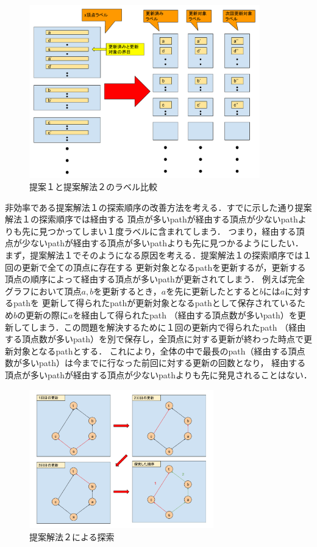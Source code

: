 \documentclass[12pt]{optlab-bachelor}
\begin{document}
\begin{figure}[htbp]
  \centering
  \caption{提案１と提案解法２のラベル比較}
  \includegraphics[width=10.0cm]{fig/fig8.pdf}
\end{figure}

非効率である提案解法１の探索順序の改善方法を考える．すでに示した通り提案解法１の探索順序では経由する
頂点が多いpathが経由する頂点が少ないpathよりも先に見つかってしまい１度ラベルに含まれてしまう．
つまり，経由する頂点が少ないpathが経由する頂点が多いpathよりも先に見つかるようにしたい．
まず，提案解法１でそのようになる原因を考える．提案解法１の探索順序では１回の更新で全ての頂点に存在する
更新対象となるpathを更新するが，更新する頂点の順序によって経由する頂点が多いpathが更新されてしまう．
例えば完全グラフにおいて頂点$a,b$を更新するとき，$a$を先に更新したとすると$b$には$a$に対するpathを
更新して得られたpathが更新対象となるpathとして保存されているため$b$の更新の際に$a$を経由して得られたpath
（経由する頂点数が多いpath）を更新してしまう．この問題を解決するために１回の更新内で得られたpath
（経由する頂点数が多いpath）を別で保存し，全頂点に対する更新が終わった時点で更新対象となるpathとする．
これにより，全体の中で最長のpath（経由する頂点数が多いpath）は今までに行なった前回に対する更新の回数となり，
経由する頂点が多いpathが経由する頂点が少ないpathよりも先に発見されることはない．

\begin{figure}[htbp]
  \centering
  \caption{提案解法２による探索}
  \includegraphics[height=6.0cm, width=8.0cm]{fig/fig7.pdf}
\end{figure}
\end{document}
